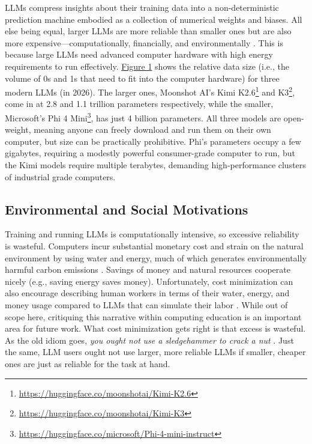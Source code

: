 LLMs compress insights about their training data into a non-deterministic prediction machine embodied as a collection of numerical weights and biases. All else being equal, larger LLMs are more reliable than smaller ones but are also more expensive---computationally, financially, and environmentally \cite{dingHybridLlmCostefficient2024,renReconcilingContrastingNarratives2024}. This is because large LLMs need advanced computer hardware with high energy requirements to run effectively. \hyperref[_Ref236385853]{Figure 1} shows the relative data size (i.e., the volume of 0s and 1s that need to fit into the computer hardware) for three modern LLMs (in 2026). The larger ones, Moonshot AI's Kimi K2.6\footnote{\url{https://huggingface.co/moonshotai/Kimi-K2.6}} and K3\footnote{\url{https://huggingface.co/moonshotai/Kimi-K3}}, come in at 2.8 and 1.1 trillion parameters respectively, while the smaller, Microsoft's Phi 4 Mini\footnote{\url{https://huggingface.co/microsoft/Phi-4-mini-instruct}}, has just 4 billion parameters. All three models are open-weight, meaning anyone can freely download and run them on their own computer, but size can be practically prohibitive. Phi's parameters occupy a few gigabytes, requiring a modestly powerful consumer-grade computer to run, but the Kimi models require multiple terabytes, demanding high-performance clusters of industrial grade computers.

\subsection{Environmental and Social Motivations}\label{environmental-and-social-motivations}

Training and running LLMs is computationally intensive, so excessive reliability is wasteful. Computers incur substantial monetary cost and strain on the natural environment by using water and energy, much of which generates environmentally harmful carbon emissions \cite{dingHybridLlmCostefficient2024,renReconcilingContrastingNarratives2024,ModelRoutingAI}. Savings of money and natural resources cooperate nicely (e.g., saving energy saves money). Unfortunately, cost minimization can also encourage describing human workers in terms of their water, energy, and money usage compared to LLMs that can simulate their labor \cite{renReconcilingContrastingNarratives2024}. While out of scope here, critiquing this narrative within computing education is an important area for future work. What cost minimization gets right is that excess is wasteful. As the old idiom goes, \emph{you ought not} \emph{use a sledgehammer to crack a nut} \cite{judsonSagesHeroesAmerican1851}. Just the same, LLM users ought not use larger, more reliable LLMs if smaller, cheaper ones are just as reliable for the task at hand.

